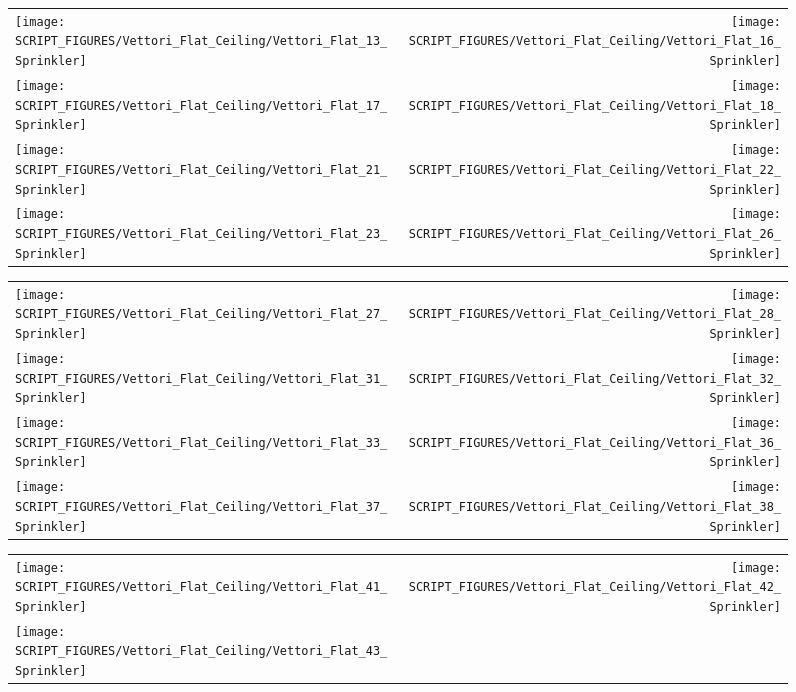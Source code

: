 \begin{figure}[!ht]
\begin{tabular*}{\textwidth}{l@{\extracolsep{\fill}}r}
\texttt{[image: SCRIPT\_FIGURES/Vettori\_Flat\_Ceiling/Vettori\_Flat\_13\_Sprinkler]} &
\texttt{[image: SCRIPT\_FIGURES/Vettori\_Flat\_Ceiling/Vettori\_Flat\_16\_Sprinkler]} \\
\texttt{[image: SCRIPT\_FIGURES/Vettori\_Flat\_Ceiling/Vettori\_Flat\_17\_Sprinkler]} &
\texttt{[image: SCRIPT\_FIGURES/Vettori\_Flat\_Ceiling/Vettori\_Flat\_18\_Sprinkler]} \\
\texttt{[image: SCRIPT\_FIGURES/Vettori\_Flat\_Ceiling/Vettori\_Flat\_21\_Sprinkler]} &
\texttt{[image: SCRIPT\_FIGURES/Vettori\_Flat\_Ceiling/Vettori\_Flat\_22\_Sprinkler]} \\
\texttt{[image: SCRIPT\_FIGURES/Vettori\_Flat\_Ceiling/Vettori\_Flat\_23\_Sprinkler]} &
\texttt{[image: SCRIPT\_FIGURES/Vettori\_Flat\_Ceiling/Vettori\_Flat\_26\_Sprinkler]}
\end{tabular*}
\end{figure}

\begin{figure}[!ht]
\begin{tabular*}{\textwidth}{l@{\extracolsep{\fill}}r}
\texttt{[image: SCRIPT\_FIGURES/Vettori\_Flat\_Ceiling/Vettori\_Flat\_27\_Sprinkler]} &
\texttt{[image: SCRIPT\_FIGURES/Vettori\_Flat\_Ceiling/Vettori\_Flat\_28\_Sprinkler]} \\
\texttt{[image: SCRIPT\_FIGURES/Vettori\_Flat\_Ceiling/Vettori\_Flat\_31\_Sprinkler]} &
\texttt{[image: SCRIPT\_FIGURES/Vettori\_Flat\_Ceiling/Vettori\_Flat\_32\_Sprinkler]} \\
\texttt{[image: SCRIPT\_FIGURES/Vettori\_Flat\_Ceiling/Vettori\_Flat\_33\_Sprinkler]} &
\texttt{[image: SCRIPT\_FIGURES/Vettori\_Flat\_Ceiling/Vettori\_Flat\_36\_Sprinkler]} \\
\texttt{[image: SCRIPT\_FIGURES/Vettori\_Flat\_Ceiling/Vettori\_Flat\_37\_Sprinkler]} &
\texttt{[image: SCRIPT\_FIGURES/Vettori\_Flat\_Ceiling/Vettori\_Flat\_38\_Sprinkler]}
\end{tabular*}
\end{figure}

\begin{figure}[!ht]
\begin{tabular*}{\textwidth}{l@{\extracolsep{\fill}}r}
\texttt{[image: SCRIPT\_FIGURES/Vettori\_Flat\_Ceiling/Vettori\_Flat\_41\_Sprinkler]} &
\texttt{[image: SCRIPT\_FIGURES/Vettori\_Flat\_Ceiling/Vettori\_Flat\_42\_Sprinkler]} \\
\texttt{[image: SCRIPT\_FIGURES/Vettori\_Flat\_Ceiling/Vettori\_Flat\_43\_Sprinkler]} &
\end{tabular*}
\end{figure}

